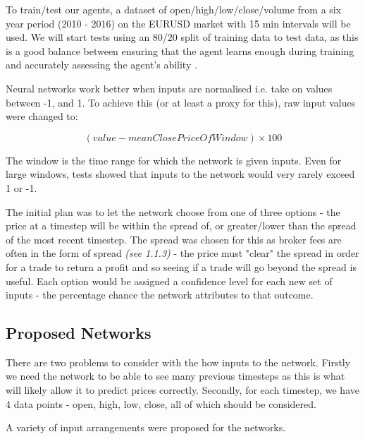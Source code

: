         To train/test our agents, a dataset of open/high/low/close/volume from a six year period (2010 - 2016) on the EURUSD market with 15 min intervals will be used. We will start tests using an 80/20 split of training data to test data, as this is a good balance between ensuring that the agent learns enough during training and accurately assessing the agent's ability \cite{google}. 

        Neural networks work better when inputs are normalised i.e. take on values between -1, and 1. To achieve this (or at least a proxy for this), raw input values were changed to:
        
        \begin{equation}
        (value - meanClosePriceOfWindow) \times 100
        \end{equation}

        The window is the time range for which the network is given inputs. Even for large windows, tests showed that inputs to the network would very rarely exceed 1 or -1.

        The initial plan was to let the network choose from one of three options - the price at a timestep will be within the spread of, or greater/lower than the spread of the most recent timestep. The spread was chosen for this as broker fees are often in the form of spread \textit{(see 1.1.3)} - the price must "clear" the spread in order for a trade to return a profit and so seeing if a trade will go beyond the spread is useful. Each option would be assigned a confidence level for each new set of inputs - the percentage chance the network attributes to that outcome.

        \subsection{Proposed Networks}

        There are two problems to consider with the how inputs to the network. Firstly we need the network to be able to see many previous timesteps as this is what will likely allow it to predict prices correctly. Secondly, for each timestep, we have 4 data points - open, high, low, close, all of which should be considered.

        A variety of input arrangements were proposed for the networks.

